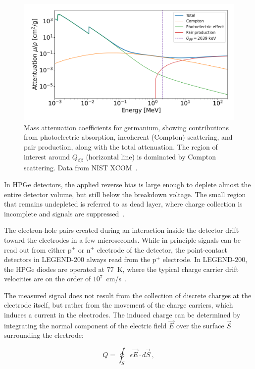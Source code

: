 \begin{figure}
    \centering
    \includegraphics[width=0.75\linewidth]{figures/03_legend/Attentuation_germanium.png}
    \caption{Mass attenuation coefficients for germanium, showing contributions from photoelectric absorption, incoherent (Compton) scattering, and pair production, along with the total attenuation. The region of interest around $Q_{\beta \beta}$ (horizontal line) is dominated by Compton scattering. Data from NIST XCOM~\cite{nist_xcom_1999}.}
\label{fig:Ge_attenuation}
\end{figure}

In HPGe detectors, the applied reverse bias is large enough to deplete almost the entire detector volume, but still below the breakdown voltage. The small region that remains undepleted is referred to as dead layer, where charge collection is incomplete and signals are suppressed~\cite{knoll_radiation_2000}. 

The electron-hole pairs created during an interaction inside the detector drift toward the electrodes in a few microseconds. 
While in principle signals can be read out from either p$^+$ or n$^+$ electrode of the detector, the point-contact detectors in LEGEND-200 always read from the p$^{+}$ electrode. 
In LEGEND-200, the HPGe diodes are operated at 77~K, where the typical charge carrier drift velocities are on the order of $10^{7}$~cm/s~\cite{comellato_charge_2021}. 

The measured signal does not result from the collection of discrete charges at the electrode itself, but rather from the movement of the charge carriers, which induces a current in the electrodes. 
The induced charge can be determined by integrating the normal component of the electric field $\vec{E}$ over the surface $\vec{S}$ surrounding the electrode: 

\begin{equation}
\label{eq:Q_ind_original}
	Q = \oint_S \epsilon \vec{E} \cdot d \vec{S} \,,
\end{equation}

